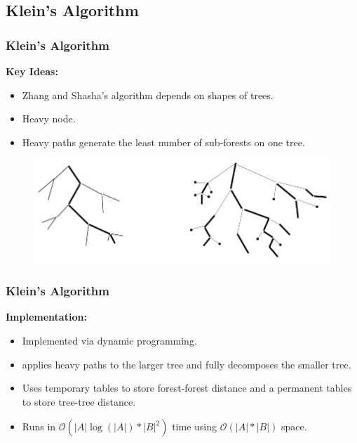 \documentclass{beamer}
\begin{document}
\subsection{Klein's Algorithm}
\begin{frame}
\frametitle{Klein's Algorithm}
\textbf{Key Ideas:}
\begin{itemize}
\item Zhang and Shasha's algorithm depends on shapes of trees.
\item Heavy node.

\item Heavy paths generate the least number of sub-forests on one tree.
\end{itemize}
\begin{figure}
	\includegraphics[width=0.8\linewidth]{HeavyPaths}
	\centering
\end{figure}
\end{frame}
\begin{frame}
\frametitle{Klein's Algorithm}
\textbf{Implementation:}
\begin{itemize}
\item Implemented via dynamic programming.
\item applies heavy paths to the larger tree and fully decomposes the smaller tree.
\item Uses temporary tables to store forest-forest distance and a permanent tables to store tree-tree distance.
\item Runs in $\mathcal{O}(\left\vert A \right\vert \log(\left\vert A \right\vert) * \left\vert B \right\vert^2)$ time using $\mathcal{O}(\left\vert A \right\vert * \left\vert B \right\vert)$ space.
\end{itemize}
\end{frame}
\end{document}
